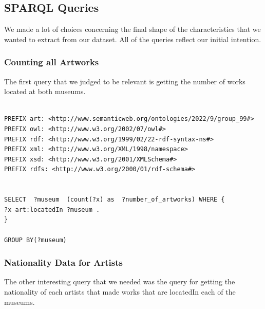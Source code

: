 \documentclass{article}
\begin{document}
\subsection{SPARQL Queries}

We made a lot of choices concerning the final shape of the characteristics that we wanted to extract from our dataset. All of the queries reflect our initial intention. 

\subsubsection{Counting all Artworks}
The first query that we judged to be relevant is getting the number of works located at both museums. 
\begin{verbatim}

PREFIX art: <http://www.semanticweb.org/ontologies/2022/9/group_99#> 
PREFIX owl: <http://www.w3.org/2002/07/owl#> 
PREFIX rdf: <http://www.w3.org/1999/02/22-rdf-syntax-ns#> 
PREFIX xml: <http://www.w3.org/XML/1998/namespace> 
PREFIX xsd: <http://www.w3.org/2001/XMLSchema#> 
PREFIX rdfs: <http://www.w3.org/2000/01/rdf-schema#> 


SELECT  ?museum  (count(?x) as  ?number_of_artworks) WHERE { 
?x art:locatedIn ?museum .
}

GROUP BY(?museum)
\end{verbatim}


\subsubsection{Nationality Data for Artists}

The other interesting query that we needed was the query for getting the nationality of each artists that made works that are locatedIn each of the museums.
\end{document}
